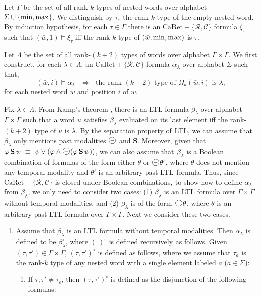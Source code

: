 \documentclass{LMCS}
\newcommand{\w}{{\bar{w}}}
\newcommand{\e}{\varepsilon}
\newcommand{\dm}{\Diamond}
\newcommand{\C}{{\mathcal{C}}}
\newcommand{\R}{{\mathcal{R}}}
\renewcommand{\S}{{\mathbf S}}
\newcommand{\next}{\text{\raisebox{1pt}{$\bigcirc$}}}
\theoremstyle{plain}
\theoremstyle{definition}
\newcommand{\prev}{{\text{\Large $\mathbf{\circleddash}$}}}
\newcommand{\caret}{\text{CaRet}}
\newcommand{\dmminus}{\dm^-}
\renewcommand{\dm}{\next}
\renewcommand{\dmminus}{\prev}
\begin{document}
{Let $\Gamma$ be the set of all rank-$k$ types of nested words over
alphabet $\Sigma \cup \{{\rm min},{\rm max}\}$. We distinguish by
$\tau_\varepsilon$ the rank-$k$ type of the empty nested word. By
induction hypothesis, for each $\tau \in \Gamma$ there is an
$\caret+\{\R,\C\}$ formula $\xi_\tau$ such that $(\w,1) \models
\xi_\tau$ iff the rank-$k$ type of $(\w,\min,\maxx)$ is $\tau$.  



Let $\Lambda$ be the set of all rank-$(k+2)$ types of words over
alphabet $\Gamma \times \Gamma$. We first construct, for each $\lambda
\in \Lambda$, an $\caret+\{\R,\C\}$  formula $\alpha_\lambda$ over
alphabet $\Sigma$  such that,
$$(\w,i) \models \alpha_\lambda \ \ \ \Longleftrightarrow \ \ \ 
\text{the rank-$(k+2)$ type of $\Omega_k(\w,i)$ is $\lambda$,}$$
 for each nested 
word $\w$ and position $i$ of $\w$. 
    
Fix $\lambda \in \Lambda$.  From Kamp's theorem \cite{Kamp}, there is
an LTL formula $\beta_\lambda$ over alphabet $\Gamma \times \Gamma$
such that a word $u$ satisfies $\beta_\lambda$ evaluated on its last
element iff the rank-$(k+2)$ type of $u$ is $\lambda$. By the
separation property of LTL, we can assume that $\beta_\lambda$ only mentions
past modalities $\dmminus$ and $\S$. Moreover, given that $\varphi\,
\S\, \psi\ \equiv\ \psi \vee (\varphi \wedge \dmminus (\varphi\, \S\,
\psi))$, we can also assume that $\beta_\lambda$ is a Boolean
combination of formulas of the form either $\theta$ or $\dmminus
\theta'$, where $\theta$ does not mention any temporal modality and
$\theta'$ is an arbitrary past LTL formula. Thus, since
$\caret+\{\R,\C\}$ is closed under Boolean combinations, to show how
to define $\alpha_\lambda$ from $\beta_\lambda$, we only need to
consider two cases: (1) $\beta_\lambda$ is an LTL formula over $\Gamma
\times \Gamma$ without temporal modalities, and (2) $\beta_\lambda$ is
of the form $\dmminus \theta$, where $\theta$ is an arbitrary past LTL
formula over $\Gamma \times \Gamma$. Next we consider these two cases.

\begin{enumerate}[$\bullet$] 

\item Assume that $\beta_\lambda$ is an LTL formula without temporal
  modalities. Then $\alpha_\lambda$ is defined to be
  $\beta_\lambda^\circ$, where $(\ )^\circ$ is defined recursively as
  follows. Given $(\tau, \tau') \in \Gamma \times \Gamma$, $(\tau,
  \tau')^\circ$ is defined as follows, where we assume that $\tau_a$
is the rank-$k$ type of any nested word with a single element labeled
$a$ ($a \in \Sigma$): 
\begin{enumerate}[(1)]
\item If $\tau, \tau' \neq \tau_\e$, then $(\tau,
  \tau')^\circ$ is defined as the
  disjunction of the following formulas: \begin{enumerate}[(a)] 


\end{enumerate}
\end{enumerate}
\end{enumerate}}
\end{document}
